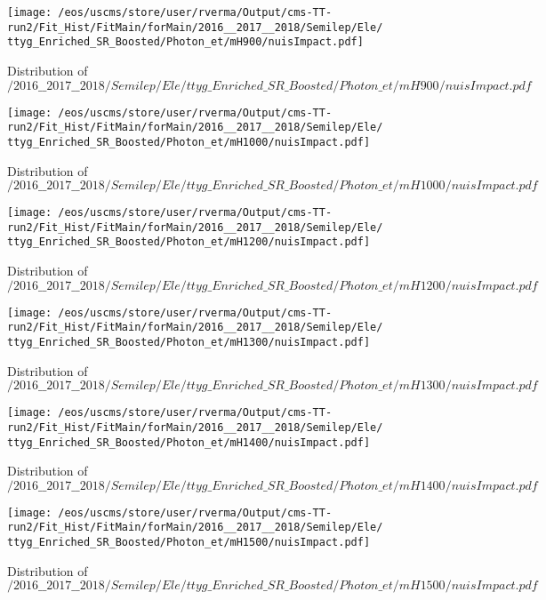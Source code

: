\begin{figure}
\centering
\texttt{[image: /eos/uscms/store/user/rverma/Output/cms-TT-run2/Fit\_Hist/FitMain/forMain/2016\_\_2017\_\_2018/Semilep/Ele/ttyg\_Enriched\_SR\_Boosted/Photon\_et/mH900/nuisImpact.pdf]}
\caption{Distribution of $/2016\_\_2017\_\_2018/Semilep/Ele/ttyg\_Enriched\_SR\_Boosted/Photon\_et/mH900/nuisImpact.pdf$}
\end{figure}

\begin{figure}
\centering
\texttt{[image: /eos/uscms/store/user/rverma/Output/cms-TT-run2/Fit\_Hist/FitMain/forMain/2016\_\_2017\_\_2018/Semilep/Ele/ttyg\_Enriched\_SR\_Boosted/Photon\_et/mH1000/nuisImpact.pdf]}
\caption{Distribution of $/2016\_\_2017\_\_2018/Semilep/Ele/ttyg\_Enriched\_SR\_Boosted/Photon\_et/mH1000/nuisImpact.pdf$}
\end{figure}

\begin{figure}
\centering
\texttt{[image: /eos/uscms/store/user/rverma/Output/cms-TT-run2/Fit\_Hist/FitMain/forMain/2016\_\_2017\_\_2018/Semilep/Ele/ttyg\_Enriched\_SR\_Boosted/Photon\_et/mH1200/nuisImpact.pdf]}
\caption{Distribution of $/2016\_\_2017\_\_2018/Semilep/Ele/ttyg\_Enriched\_SR\_Boosted/Photon\_et/mH1200/nuisImpact.pdf$}
\end{figure}

\begin{figure}
\centering
\texttt{[image: /eos/uscms/store/user/rverma/Output/cms-TT-run2/Fit\_Hist/FitMain/forMain/2016\_\_2017\_\_2018/Semilep/Ele/ttyg\_Enriched\_SR\_Boosted/Photon\_et/mH1300/nuisImpact.pdf]}
\caption{Distribution of $/2016\_\_2017\_\_2018/Semilep/Ele/ttyg\_Enriched\_SR\_Boosted/Photon\_et/mH1300/nuisImpact.pdf$}
\end{figure}

\begin{figure}
\centering
\texttt{[image: /eos/uscms/store/user/rverma/Output/cms-TT-run2/Fit\_Hist/FitMain/forMain/2016\_\_2017\_\_2018/Semilep/Ele/ttyg\_Enriched\_SR\_Boosted/Photon\_et/mH1400/nuisImpact.pdf]}
\caption{Distribution of $/2016\_\_2017\_\_2018/Semilep/Ele/ttyg\_Enriched\_SR\_Boosted/Photon\_et/mH1400/nuisImpact.pdf$}
\end{figure}

\begin{figure}
\centering
\texttt{[image: /eos/uscms/store/user/rverma/Output/cms-TT-run2/Fit\_Hist/FitMain/forMain/2016\_\_2017\_\_2018/Semilep/Ele/ttyg\_Enriched\_SR\_Boosted/Photon\_et/mH1500/nuisImpact.pdf]}
\caption{Distribution of $/2016\_\_2017\_\_2018/Semilep/Ele/ttyg\_Enriched\_SR\_Boosted/Photon\_et/mH1500/nuisImpact.pdf$}
\end{figure}


